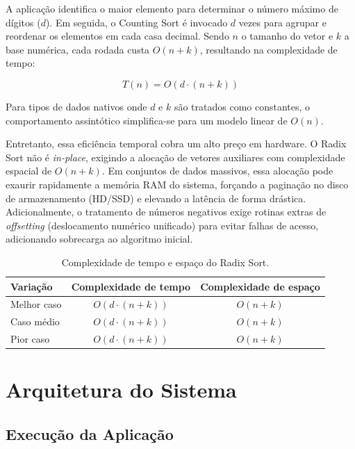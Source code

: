 \documentclass{article}
\begin{document}
    A aplicação identifica o maior elemento para determinar o número máximo de dígitos ($d$). Em seguida, o Counting Sort é invocado $d$ vezes para agrupar e reordenar os elementos em cada casa decimal. Sendo $n$ o tamanho do vetor e $k$ a base numérica, cada rodada custa $O(n + k)$, resultando na complexidade de tempo:

    $$
        T(n) = O(d \cdot (n + k))
    $$

    Para tipos de dados nativos onde $d$ e $k$ são tratados como constantes, o comportamento assintótico simplifica-se para um modelo linear de $O(n)$.

    Entretanto, essa eficiência temporal cobra um alto preço em hardware. O Radix Sort não é \textit{in-place}, exigindo a alocação de vetores auxiliares com complexidade espacial de $O(n + k)$. Em conjuntos de dados massivos, essa alocação pode exaurir rapidamente a memória RAM do sistema, forçando a paginação no disco de armazenamento (HD/SSD) e elevando a latência de forma drástica. Adicionalmente, o tratamento de números negativos exige rotinas extras de \textit{offsetting} (deslocamento numérico unificado) para evitar falhas de acesso, adicionando sobrecarga ao algoritmo inicial.

    \begin{table}[H]
        \centering
        \label{tab:complexidade_radix}
        \begin{tabular}{lcc}
        \toprule
        \textbf{Variação} & \textbf{Complexidade de tempo} & \textbf{Complexidade de espaço} \\
        \midrule
        Melhor caso     & $O(d \cdot (n+k))$ & $O(n + k)$ \\
        Caso médio      & $O(d \cdot (n+k))$ & $O(n + k)$ \\
        Pior caso       & $O(d \cdot (n+k))$ & $O(n + k)$ \\
        \bottomrule
        \end{tabular}
        \caption{Complexidade de tempo e espaço do Radix Sort.}
    \end{table}


\section{Arquitetura do Sistema}

\subsection{Execução da Aplicação}
\end{document}
